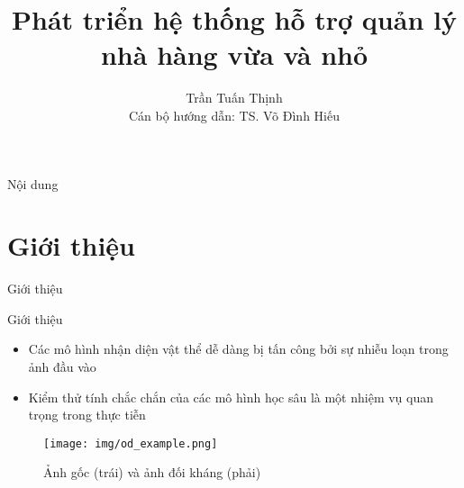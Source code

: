 \documentclass[aspectratio=169, 12pt]{beamer}
\begin{document}
% 

\begin{frame}
\title[AOD]{\textbf{Phát triển hệ thống hỗ trợ quản lý nhà hàng vừa và nhỏ}}
\author{Trần Tuấn Thịnh \\ {\small Cán bộ hướng dẫn: TS. Võ Đình Hiếu}}
\maketitle
\end{frame}
 
\begin{frame}{Nội dung}
    \tableofcontents 
\end{frame}
	
\section{Giới thiệu}
\begin{frame}
\vfill
\begin{center}
\Large{Giới thiệu}
\end{center}
\vfill
\end{frame}

\begin{frame}{Giới thiệu}
\begin{spacing}{1.2}
   \begin{itemize}
          \item Các mô hình nhận diện vật thể dễ dàng bị tấn công bởi sự nhiễu loạn trong ảnh đầu vào
   
          \item Kiểm thử tính chắc chắn của các mô hình học sâu là một nhiệm vụ quan trọng trong thực tiễn
    \end{itemize}
        
\begin{figure}[!hbpt]
  \centering
  \texttt{[image: img/od\_example.png]}
  \caption{Ảnh gốc (trái) và ảnh đối kháng (phải)}
  \label{fig:demo1}
\end{figure}

\end{spacing}
\end{frame}
	
\end{document}
